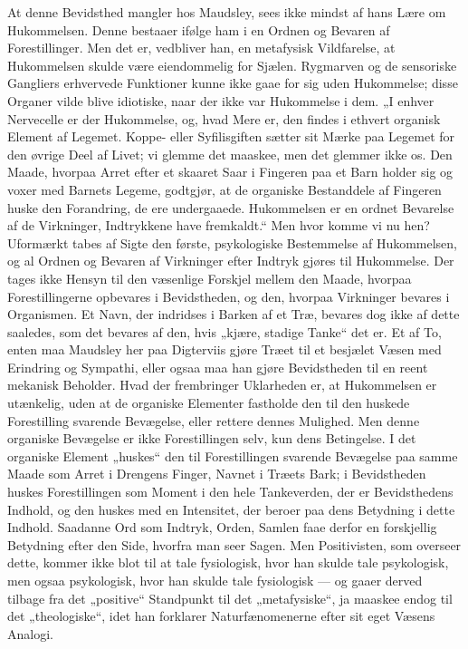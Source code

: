\documentclass[12pt,a4paper,openany]{book}
\newcommand{\opage}[1]{\marginnote{\footnotesize\textit{[#1]}}}
\begin{document}
At denne Bevidsthed mangler hos Maudsley, sees ikke
mindst af hans Lære om Hukommelsen. Denne bestaaer
ifølge ham i en Ordnen og Bevaren af Forestillinger. Men
det er, vedbliver han, en metafysisk Vildfarelse, at Hukommelsen
skulde være eiendommelig for Sjælen. Rygmarven
og de sensoriske Gangliers erhvervede Funktioner kunne ikke
gaae for sig uden Hukommelse; disse Organer vilde blive
idiotiske, naar der ikke var Hukommelse i dem. „I enhver
Nervecelle er der Hukommelse, og, hvad Mere er, den findes
i ethvert organisk Element af Legemet. Koppe- eller Syfilisgiften
sætter sit Mærke paa Legemet for den øvrige Deel
af Livet; vi glemme det maaskee, men det glemmer ikke os.
Den Maade, hvorpaa Arret efter et skaaret Saar i Fingeren
paa et Barn holder sig og voxer med Barnets Legeme,
godtgjør, at de organiske Bestanddele af Fingeren huske den
Forandring, de ere undergaaede. Hukommelsen er en ordnet
Bevarelse af de Virkninger, Indtrykkene have fremkaldt.“
Men hvor komme vi nu hen? Uformærkt tabes af Sigte
den første, psykologiske Bestemmelse af Hukommelsen, og al
Ordnen og Bevaren af Virkninger efter Indtryk gjøres til
Hukommelse. Der tages ikke Hensyn til den væsenlige Forskjel
mellem den Maade, hvorpaa Forestillingerne opbevares
i Bevidstheden, og den, hvorpaa Virkninger bevares i Organismen.
Et Navn, der indridses i Barken af et Træ,
bevares dog ikke af dette saaledes, som det bevares af den,
hvis „kjære, stadige Tanke“ det er. Et af To, enten maa
Maudsley her paa Digterviis gjøre Træet til et besjælet
Væsen med Erindring og Sympathi, eller ogsaa maa han
gjøre Bevidstheden til en reent mekanisk Beholder. Hvad
der frembringer Uklarheden er, at Hukommelsen er utænkelig,
uden at de organiske Elementer fastholde den til den huskede
Forestilling svarende Bevægelse, eller rettere dennes Mulighed.
Men denne organiske Bevægelse er ikke Forestillingen selv,
kun dens Betingelse. I det organiske Element „huskes“ den
\opage{320}til Forestillingen svarende Bevægelse paa samme Maade som
Arret i Drengens Finger, Navnet i Træets Bark; i Bevidstheden
huskes Forestillingen som Moment i den hele
Tankeverden, der er Bevidsthedens Indhold, og den huskes
med en Intensitet, der beroer paa dens Betydning i dette
Indhold. Saadanne Ord som Indtryk, Orden, Samlen
faae derfor en forskjellig Betydning efter den Side, hvorfra
man seer Sagen. Men Positivisten, som overseer dette,
kommer ikke blot til at tale fysiologisk, hvor han skulde tale
psykologisk, men ogsaa psykologisk, hvor han skulde tale fysiologisk
--- og gaaer derved tilbage fra det „positive“ Standpunkt
til det „metafysiske“, ja maaskee endog til det „theologiske“,
idet han forklarer Naturfænomenerne efter sit eget
Væsens Analogi.
\end{document}
